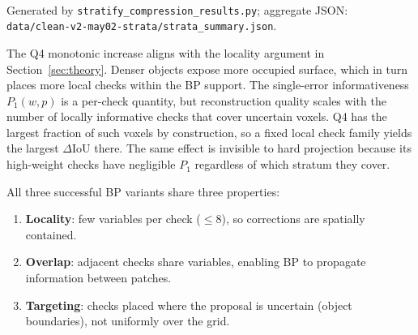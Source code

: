 \documentclass[11pt,a4paper]{article}
\begin{document}
\begin{table}[htbp]
\centering
\caption{Clean L4 results stratified by occupancy rank quartile. Each stratum
contains 50 validation objects per seed; entries are mean $\pm$ SEM over seeds
42/43/44. Local BP helps in every quartile and helps most in the densest,
hardest objects.}
\label{tab:strata}
\\[4pt]
\footnotesize{Generated by \texttt{stratify\_compression\_results.py};
aggregate JSON: \texttt{data/clean-v2-may02-strata/strata\_summary.json}.}
\end{table}

The Q4 monotonic increase aligns with the locality argument in
Section~\ref{sec:theory}. Denser objects expose more occupied surface, which
in turn places more local checks within the BP support. The single-error
informativeness $P_1(w,p)$ is a per-check quantity, but reconstruction
quality scales with the number of locally informative checks that cover
uncertain voxels. Q4 has the largest fraction of such voxels by
construction, so a fixed local check family yields the largest
$\Delta$IoU there. The same effect is invisible to hard projection because
its high-weight checks have negligible $P_1$ regardless of which stratum
they cover.

All three successful BP variants share three properties:
\begin{enumerate}[nosep]
  \item \textbf{Locality}: few variables per check ($\leq 8$), so
    corrections are spatially contained.
  \item \textbf{Overlap}: adjacent checks share variables, enabling
    BP to propagate information between patches.
  \item \textbf{Targeting}: checks placed where the proposal is uncertain
    (object boundaries), not uniformly over the grid.
\end{enumerate}
\end{document}
